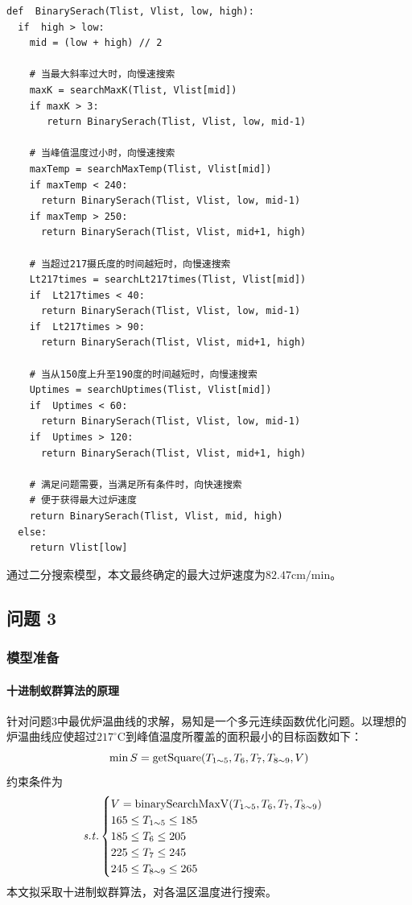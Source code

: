 \documentclass[../main.tex]{subfiles}
\begin{document}
\begin{verbatim}
def  BinarySerach(Tlist, Vlist, low, high):
  if  high > low:
    mid = (low + high) // 2

    # 当最大斜率过大时，向慢速搜索
    maxK = searchMaxK(Tlist, Vlist[mid])
    if maxK > 3:
       return BinarySerach(Tlist, Vlist, low, mid-1)

    # 当峰值温度过小时，向慢速搜索
    maxTemp = searchMaxTemp(Tlist, Vlist[mid])
    if maxTemp < 240:
      return BinarySerach(Tlist, Vlist, low, mid-1)
    if maxTemp > 250:
      return BinarySerach(Tlist, Vlist, mid+1, high)

    # 当超过217摄氏度的时间越短时，向慢速搜索
    Lt217times = searchLt217times(Tlist, Vlist[mid])
    if  Lt217times < 40:
      return BinarySerach(Tlist, Vlist, low, mid-1)
    if  Lt217times > 90:
      return BinarySerach(Tlist, Vlist, mid+1, high)

    # 当从150度上升至190度的时间越短时，向慢速搜索
    Uptimes = searchUptimes(Tlist, Vlist[mid])
    if  Uptimes < 60:
      return BinarySerach(Tlist, Vlist, low, mid-1)
    if  Uptimes > 120:
      return BinarySerach(Tlist, Vlist, mid+1, high)

    # 满足问题需要，当满足所有条件时，向快速搜索
    # 便于获得最大过炉速度
    return BinarySerach(Tlist, Vlist, mid, high)
  else:
    return Vlist[low]
\end{verbatim}
通过二分搜索模型，本文最终确定的最大过炉速度为\(82.47 \mathrm{cm}/\mathrm{min}\)。

\subsection{问题 3}
\subsubsection{模型准备}
\paragraph{十进制蚁群算法的原理}
针对问题3中最优炉温曲线的求解，易知是一个多元连续函数优化问题。以理想的炉温曲线应使超过\(217 ^{\circ}\mathrm{C}\)到峰值温度所覆盖的面积最小的目标函数如下：
\begin{equation}
\min S = \mathrm{getSquare} (T _{1 {\sim} 5},T _{6} , T _{7} , T _{8 {\sim} 9}, V) \\
\end{equation}
约束条件为
\begin{equation}{\it s.t.}
\begin{cases}
V = \mathrm{binarySearchMaxV} (T _{1{\sim} 5}, T_{6} , T _{7},T_{8{\sim} 9})\\
165 \le T_{1 {\sim} 5} \le 185\\
185 \le T _{6} \le 205 \\
225 \le T _{7} \le 245 \\
245 \le T _{8 {\sim} 9} \le 265
\end{cases}
\end{equation}
本文拟采取十进制蚁群算法，对各温区温度进行搜索。
\end{document}
